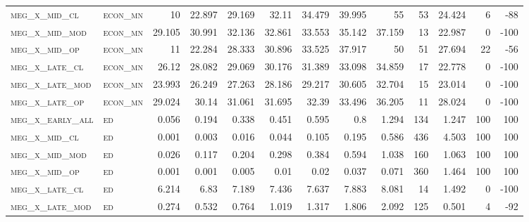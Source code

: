 \begin{landscape}
\begin{center}
\begin{footnotesize}
\begin{longtable}{llrrrrrrrr|rrr}
\textsc{meg\_x\_mid\_cl   } & \textsc{econ\_mn  }   & 10       & 22.897   & 29.169   & 32.11    & 34.479   & 39.995   & 55        & 53     & 24.424        & 6             & -88             \\
\textsc{meg\_x\_mid\_mod  } & \textsc{econ\_mn  }   & 29.105   & 30.991   & 32.136   & 32.861   & 33.553   & 35.142   & 37.159    & 13     & 22.987        & 0             & -100            \\
\textsc{meg\_x\_mid\_op   } & \textsc{econ\_mn  }   & 11       & 22.284   & 28.333   & 30.896   & 33.525   & 37.917   & 50        & 51     & 27.694        & 22            & -56             \\
\textsc{meg\_x\_late\_cl  } & \textsc{econ\_mn  }   & 26.12    & 28.082   & 29.069   & 30.176   & 31.389   & 33.098   & 34.859    & 17     & 22.778        & 0             & -100            \\
\textsc{meg\_x\_late\_mod } & \textsc{econ\_mn  }   & 23.993   & 26.249   & 27.263   & 28.186   & 29.217   & 30.605   & 32.704    & 15     & 23.014        & 0             & -100            \\
\textsc{meg\_x\_late\_op  } & \textsc{econ\_mn  }   & 29.024   & 30.14    & 31.061   & 31.695   & 32.39    & 33.496   & 36.205    & 11     & 28.024        & 0             & -100            \\
\textsc{meg\_x\_early\_all} & \textsc{ed        }   & 0.056    & 0.194    & 0.338    & 0.451    & 0.595    & 0.8      & 1.294     & 134    & 1.247         & 100           & 100             \\
\textsc{meg\_x\_mid\_cl   } & \textsc{ed        }   & 0.001    & 0.003    & 0.016    & 0.044    & 0.105    & 0.195    & 0.586     & 436    & 4.503         & 100           & 100             \\
\textsc{meg\_x\_mid\_mod  } & \textsc{ed        }   & 0.026    & 0.117    & 0.204    & 0.298    & 0.384    & 0.594    & 1.038     & 160    & 1.063         & 100           & 100             \\
\textsc{meg\_x\_mid\_op   } & \textsc{ed        }   & 0.001    & 0.001    & 0.005    & 0.01     & 0.02     & 0.037    & 0.071     & 360    & 1.464         & 100           & 100             \\
\textsc{meg\_x\_late\_cl  } & \textsc{ed        }   & 6.214    & 6.83     & 7.189    & 7.436    & 7.637    & 7.883    & 8.081     & 14     & 1.492         & 0             & -100            \\
\textsc{meg\_x\_late\_mod } & \textsc{ed        }   & 0.274    & 0.532    & 0.764    & 1.019    & 1.317    & 1.806    & 2.092     & 125    & 0.501         & 4             & -92             \\

\end{longtable}
\end{footnotesize}
\end{center}
\end{landscape}
